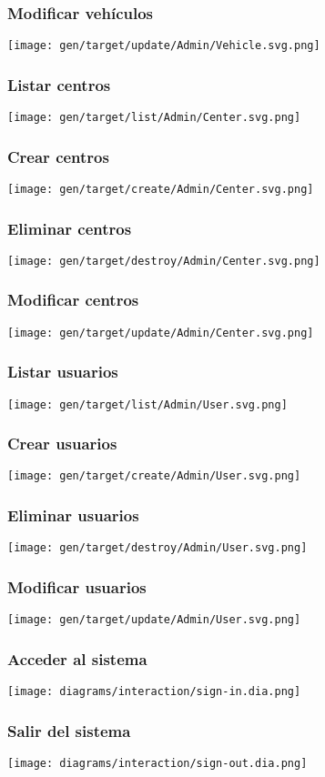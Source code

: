 \subsubsection{Modificar vehículos}
\texttt{[image: gen/target/update/Admin/Vehicle.svg.png]}

\subsubsection{Listar centros}
\texttt{[image: gen/target/list/Admin/Center.svg.png]}

\subsubsection{Crear centros}
\texttt{[image: gen/target/create/Admin/Center.svg.png]}

\subsubsection{Eliminar centros}
\texttt{[image: gen/target/destroy/Admin/Center.svg.png]}

\subsubsection{Modificar centros}
\texttt{[image: gen/target/update/Admin/Center.svg.png]}

\subsubsection{Listar usuarios}
\texttt{[image: gen/target/list/Admin/User.svg.png]}

\subsubsection{Crear usuarios}
\texttt{[image: gen/target/create/Admin/User.svg.png]}

\subsubsection{Eliminar usuarios}
\texttt{[image: gen/target/destroy/Admin/User.svg.png]}

\subsubsection{Modificar usuarios}
\texttt{[image: gen/target/update/Admin/User.svg.png]}

\subsubsection{Acceder al sistema}
\texttt{[image: diagrams/interaction/sign-in.dia.png]}

\subsubsection{Salir del sistema}
\texttt{[image: diagrams/interaction/sign-out.dia.png]}

